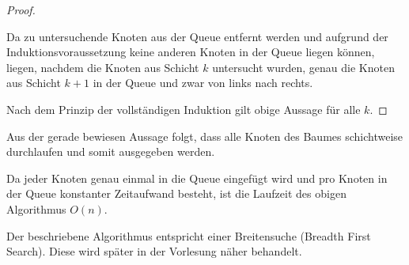 \documentclass[11pt,a4paper]{article}
\begin{document}
\begin{loesung}
\begin{enumerate}
\begin{proof}
\begin{description}
                Da zu untersuchende Knoten aus der Queue entfernt werden und aufgrund der Induktionsvoraussetzung keine anderen Knoten in der Queue liegen können, liegen, nachdem die Knoten aus Schicht $k$ untersucht wurden, genau die Knoten aus Schicht $k + 1$ in der Queue und zwar von links nach rechts.
            \end{description}
            Nach dem Prinzip der vollständigen Induktion gilt obige Aussage für alle $k$.
        \end{proof}
        Aus der gerade bewiesen Aussage folgt, dass alle Knoten des Baumes schichtweise durchlaufen und somit ausgegeben werden.

        Da jeder Knoten genau einmal in die Queue eingefügt wird und pro Knoten in der Queue konstanter Zeitaufwand besteht, ist die Laufzeit des obigen Algorithmus $O(n)$.

        Der beschriebene Algorithmus entspricht einer Breitensuche (Breadth First Search).
        Diese wird später in der Vorlesung näher behandelt.


\end{enumerate}
\end{loesung}
\end{document}
